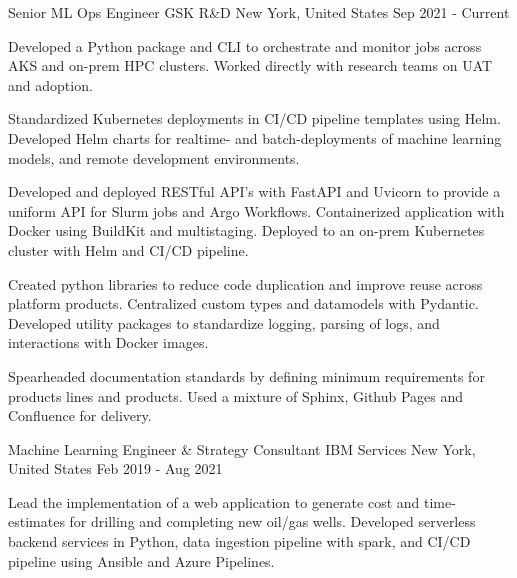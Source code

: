 

\begin{cventries}

\cventry
  {Senior ML Ops Engineer} %
  {GSK R\&D}
  {New York, United States} %
  {Sep 2021 - Current} %
  {
    \begin{cvitems} %
      \item { Developed a Python package and CLI to orchestrate and monitor jobs across AKS and on-prem HPC clusters. Worked directly with research teams on UAT and adoption. }
      \item { Standardized Kubernetes deployments in CI/CD pipeline templates using Helm. Developed Helm charts for realtime- and batch-deployments of machine learning models, and remote development environments. }
      \item { Developed and deployed RESTful API's with FastAPI and Uvicorn to provide a uniform API for Slurm jobs and Argo Workflows. Containerized application with Docker using BuildKit and multistaging. Deployed to an on-prem Kubernetes cluster with Helm and CI/CD pipeline. }
      \item { Created python libraries to reduce code duplication and improve reuse across platform products. Centralized custom types and datamodels with Pydantic. Developed utility packages to standardize logging, parsing of logs, and interactions with Docker images. }
      \item { Spearheaded documentation standards by defining minimum requirements for products lines and products. Used a mixture of Sphinx, Github Pages and Confluence for delivery. }
    \end{cvitems}
  }
  \cventry
    {Machine Learning Engineer \& Strategy Consultant} %
    {IBM Services}
    {New York, United States} %
    {Feb 2019 - Aug 2021} %
    {
      \begin{cvitems} %
        \item {Lead the implementation of a web application to generate cost and time-estimates for drilling and completing new oil/gas wells. Developed serverless backend services in Python, data ingestion pipeline with spark, and CI/CD pipeline using Ansible and Azure Pipelines.}

\end{cvitems}}
\end{cventries}
